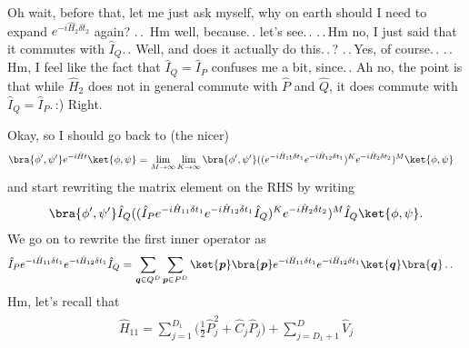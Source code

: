 \documentclass{report}
\begin{document}
Oh wait, before that, let me just ask myself, why on earth should I need to expand $e^{-i  \hat H_{2} \delta t_2}$ again? .\,.\, Hm well, because.\,. let's see.\,. .\,.\,Hm no, I just said that it commutes with $\hat I_Q$.\,. Well, and does it actually do this.\,.\,? .\,.\,Yes, of course.\,. .\,.\,Hm, I feel like the fact that $\hat I_Q = \hat I_P$ confuses me a bit, since.\,. Ah no, the point is that while $\hat H_2$ does not in general commute with $\hat P$ and $\hat Q$, it does commute with $\hat I_Q = \hat I_P$.\,:) Right. 

Okay, so I should go back to (the nicer)
\begin{align}
\begin{aligned}
	\bra{\phi', \psi'} e^{-i \hat H t} \ket{\phi, \psi} 
	=&\,
	\lim_{M \to \infty} \lim_{K \to \infty} 
		\bra{\phi', \psi'} (
			(e^{-i  \hat H_{11} \delta t_1 } e^{-i \hat H_{12} \delta t_1})^{K}
			e^{-i  \hat H_{2} \delta t_2}
		)^M
		\ket{\phi, \psi}
	\label{Trotter_H_03}
\end{aligned}
\end{align} 
and start rewriting the matrix element on the RHS by writing
\begin{align}
\begin{aligned}
	\bra{\phi', \psi'} \hat I_Q 
		(
			(\hat I_P e^{-i  \hat H_{11} \delta t_1 } e^{-i \hat H_{12} \delta t_1} \hat I_Q)^{K}
			e^{-i  \hat H_{2} \delta t_2}
		)^M 
		\hat I_Q
	\ket{\phi, \psi}.
\end{aligned}
\end{align}
We go on to rewrite the first inner operator as
\begin{align}
\begin{aligned}
	\hat I_P e^{-i  \hat H_{11} \delta t_1 } e^{-i \hat H_{12} \delta t_1} \hat I_Q
	=&\,
	\sum_{\boldsymbol{q} \in Q^D}\sum_{\boldsymbol{p} \in P^D}
		\ket{\boldsymbol{p}}\bra{\boldsymbol{p}}
			e^{-i  \hat H_{11} \delta t_1 } 
			e^{-i \hat H_{12} \delta t_1}
		\ket{\boldsymbol{q}}\bra{\boldsymbol{q}} \,.\,.
\end{aligned}
\end{align}
Hm, let's recall that
\begin{align}
\begin{aligned}
	\hat H_{11} = 
		\sum_{j=1}^{D_1} \big(
			\frac{1}{2} \hat P_{j}^2 + 
			\hat C_{j} \hat P_{j}
		\big) + 
		\sum_{j=D_1+1}^{D}
			\hat V_{j} 
\end{aligned}
\end{align} 
\end{document}
